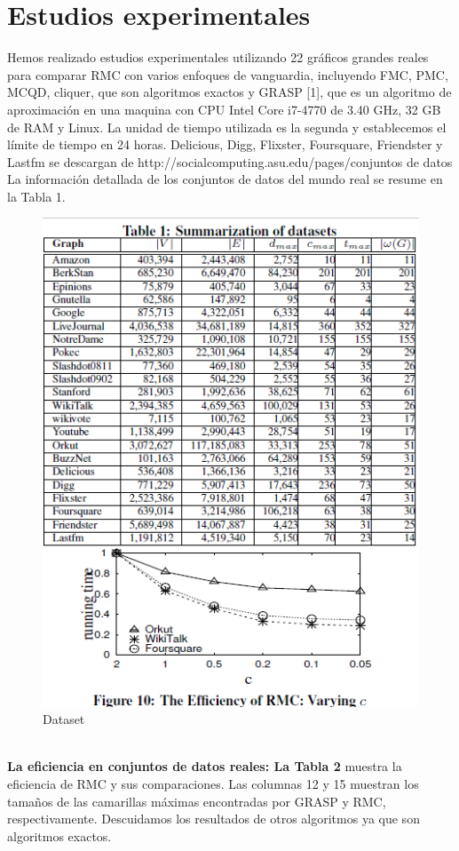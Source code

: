 \section{Estudios experimentales}
Hemos realizado estudios experimentales utilizando 22 gráficos grandes reales para comparar RMC con varios enfoques de vanguardia, incluyendo FMC, PMC, MCQD, cliquer, que son algoritmos exactos y GRASP [1], que es un algoritmo de aproximación en una maquina con CPU Intel Core i7-4770 de 3.40 GHz, 32 GB de RAM y Linux. La unidad de tiempo utilizada es la segunda y establecemos el límite de tiempo en 24 horas.
Delicious, Digg, Flixster, Foursquare, Friendster y Lastfm se descargan de http://socialcomputing.asu.edu/pages/conjuntos de datos La información detallada de los conjuntos de datos del mundo real se resume en la Tabla 1.
\\
\begin{figure}[h!]
\centering
\includegraphics[scale=1]{img/imagen18.png}
\caption{Dataset}
\label{Comandos}
\end{figure}
\\
\textbf{La eficiencia en conjuntos de datos reales: La Tabla 2} muestra la eficiencia de RMC y sus comparaciones. Las columnas 12 y 15 muestran los tamaños de las camarillas máximas encontradas por GRASP y RMC, respectivamente. Descuidamos los resultados de otros algoritmos ya que son algoritmos exactos.

